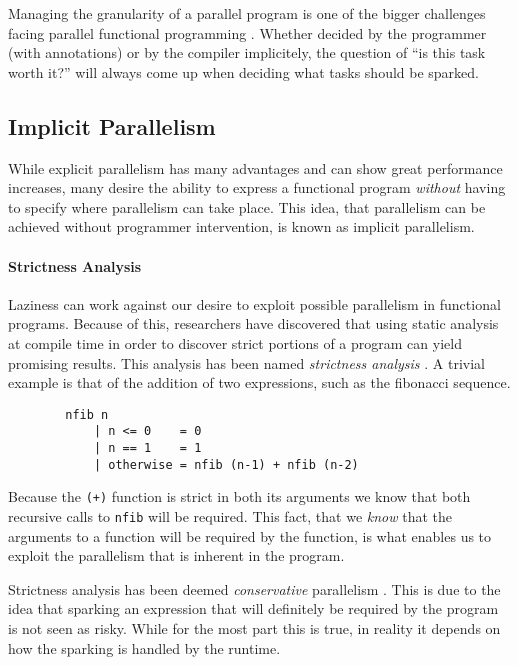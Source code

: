     Managing the granularity of a parallel program is one of the bigger
challenges facing parallel functional programming \citep{SPJ:PIFPL}. Whether
decided by the programmer (with annotations) or by the compiler implicitely,
the question of ``is this task worth it?'' will always come up when deciding
what tasks should be sparked.


 \subsection{Implicit Parallelism}
   While explicit parallelism has many advantages and can show great performance
increases, many desire the ability to express a functional program
\emph{without} having to specify where parallelism can take place. This idea,
that parallelism can be achieved without programmer intervention, is known as
implicit parallelism.

  \paragraph{Strictness Analysis}
    Laziness can work against our desire to exploit possible parallelism in
functional programs. Because of this, researchers have discovered that using
static analysis at compile time in order to discover strict portions of a
program can yield promising results. This analysis has been named
\emph{strictness analysis} \citep{ritabook, SPJ:PIFPL}. A trivial example is that
of the addition of two expressions, such as the fibonacci sequence.

\begin{verbatim}
        nfib n
            | n <= 0    = 0
            | n == 1    = 1
            | otherwise = nfib (n-1) + nfib (n-2)
\end{verbatim}

Because the \verb=(+)= function is strict in both its arguments we know that
both recursive calls to \verb=nfib= will be required. This fact, that we
\emph{know} that the arguments to a function will be required by the function,
is what enables us to exploit the parallelism that is inherent in the program.

    Strictness analysis has
been deemed \emph{conservative} parallelism \citep{SPJ:PIFPL}. This is due to
the idea that sparking an expression that will definitely be required by the
program is not seen as risky. While for the most part this is true, in reality
it depends on how the sparking is handled by the runtime.

